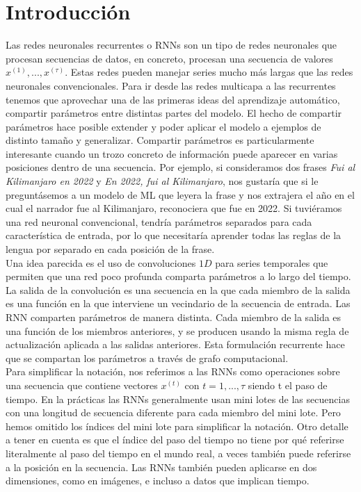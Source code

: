 \newpage 
\section{Introducción}



        
        
        
    Las redes neuronales recurrentes o RNNs son un tipo de redes neuronales que procesan secuencias de datos, en concreto, procesan una secuencia de valores $x^{(1)},...,x^{(\tau)}$. Estas redes pueden manejar series mucho más largas que las redes neuronales convencionales. Para ir desde las redes multicapa a las recurrentes tenemos que aprovechar una de las primeras ideas del aprendizaje automático, compartir parámetros entre distintas partes del modelo. El hecho de compartir parámetros hace posible extender y poder aplicar el modelo a ejemplos de distinto tamaño y generalizar. Compartir parámetros es particularmente interesante cuando un trozo concreto de información puede aparecer en varias posiciones dentro de una secuencia. Por ejemplo, si consideramos dos frases \textit{Fui al Kilimanjaro en 2022} y \textit{En 2022, fui al Kilimanjaro}, nos gustaría que si le preguntásemos a un modelo de ML que leyera la frase y nos extrajera el año en el cual el narrador fue al Kilimanjaro, reconociera que fue en 2022. Si tuviéramos una red neuronal convencional, tendría parámetros separados para cada característica de entrada, por lo que necesitaría aprender todas las reglas de la lengua por separado en cada posición de la frase. \\
        
    Una idea parecida es el uso de convoluciones $1D$ para series temporales que permiten que una red poco profunda comparta parámetros a lo largo del tiempo. La salida de la convolución es una secuencia en la que cada miembro de la salida es una función en la que interviene un vecindario de la secuencia de entrada. Las RNN comparten parámetros de manera distinta. Cada miembro de la salida es una función de los miembros anteriores, y se producen usando la misma regla de actualización aplicada a las salidas anteriores. Esta formulación recurrente hace que se compartan los parámetros a través de grafo computacional. \\ 
        
    Para simplificar la notación, nos referimos a las RNNs como operaciones sobre una secuencia que contiene vectores $x^{(t)}$ con $t=1,...,\tau$ siendo t el paso de tiempo. En la prácticas las RNNs generalmente usan mini lotes de las secuencias con una longitud de secuencia diferente para cada miembro del mini lote. Pero hemos omitido los índices del mini lote para simplificar la notación. Otro detalle a tener en cuenta es que el índice del paso del tiempo no tiene por qué referirse literalmente al paso del tiempo en el mundo real, a veces también puede referirse a la posición en la secuencia. Las RNNs también pueden aplicarse en dos dimensiones, como en imágenes, e incluso a datos que implican tiempo. \\
        
